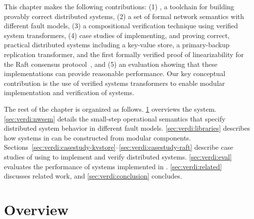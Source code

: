 %
%
%


This chapter makes the following contributions:
%
(1) \Verdi, a toolchain for building provably correct distributed systems,
%
(2) a set of formal network semantics with different fault models,
%
(3) a compositional verification technique using verified system
transformers,
%
(4) case studies of implementing, and proving correct, practical
distributed systems including a key-value store, a primary-backup
replication transformer, and the first formally verified proof of
linearizability for the Raft consensus protocol~\cite{ongaro:raft},
%
and (5) an evaluation showing that these implementations
can provide reasonable performance.
%
Our key conceptual contribution is the use of verified
systems transformers to enable modular implementation and
verification of systems.

The rest of the chapter is organized as follows.
%
\cref{sec:verdi:overview} overviews the \Verdi system.
%
\cref{sec:verdi:nwsem} details the small-step operational semantics that
specify distributed system behavior in different fault models.
%
\cref{sec:verdi:libraries} describes how systems in \Verdi can
be constructed from modular components.
%
Sections~\ref{sec:verdi:casestudy-kvstore}--\ref{sec:verdi:casestudy-raft} describe
case studies of using \Verdi to implement and verify distributed systems.
%
\cref{sec:verdi:eval} evaluates the performance of systems implemented in
\Verdi.
%
\cref{sec:verdi:related} discusses related work, and \cref{sec:verdi:conclusion}
concludes.


\section{Overview}
\label{sec:verdi:overview}

